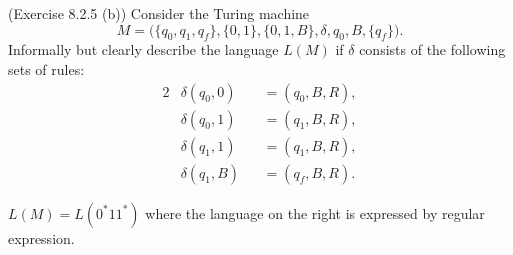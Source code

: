 \documentclass[10pt]{homework}
\begin{document}
\begin{problem} (Exercise 8.2.5 (b)) Consider the Turing machine
  \begin{equation*}
    M = \bigl( \{q_{0}, q_{1}, q_{f}\}, \{0,1\}, \{0,1,B\},
    \delta, q_{0}, B, \{q_{f}\} \bigr).
  \end{equation*}
  Informally but clearly describe the language $L(M)$ if $\delta$ consists of
  the following sets of rules:
  \begin{alignat*}{2}
    & \delta(q_{0}, 0) && = (q_{0}, B, R),\\
    & \delta(q_{0}, 1) && = (q_{1}, B, R),\\
    & \delta(q_{1}, 1) && = (q_{1}, B, R),\\
    & \delta(q_{1}, B) && = (q_{f}, B, R).
  \end{alignat*}
\end{problem}

\begin{solution}
    $L\left( M \right)=L\left( 0^{*}11^{*} \right) $ where the language on the right is expressed by regular expression.
\end{solution}
\end{document}
